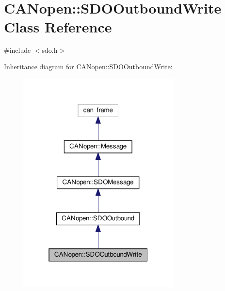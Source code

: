 \hypertarget{class_c_a_nopen_1_1_s_d_o_outbound_write}{}\section{C\+A\+Nopen\+:\+:S\+D\+O\+Outbound\+Write Class Reference}
\label{class_c_a_nopen_1_1_s_d_o_outbound_write}


{\ttfamily \#include $<$sdo.\+h$>$}



Inheritance diagram for C\+A\+Nopen\+:\+:S\+D\+O\+Outbound\+Write\+:\nopagebreak
\begin{figure}[H]
\begin{center}
\leavevmode
\includegraphics[width=232pt]{class_c_a_nopen_1_1_s_d_o_outbound_write__inherit__graph}
\end{center}
\end{figure}


